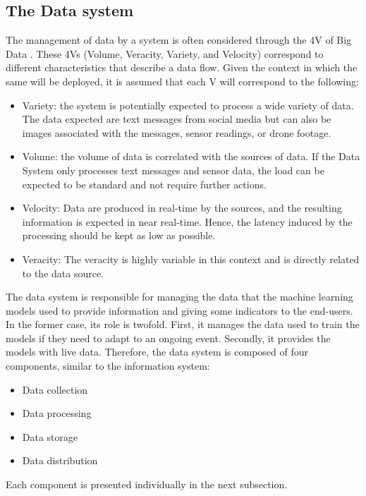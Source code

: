 \subsection{The Data system}
The management of data by a system is often considered through the 4V of Big Data \parencite{kalyvasBigDataPrimer2014}.
These 4Vs (Volume, Veracity, Variety, and Velocity) correspond to different characteristics that describe a data flow.
Given the context in which the same will be deployed, it is assumed that each V will correspond to the following:

\begin{itemize}
    \item Variety: the system is potentially expected to process a wide variety of data.
          The data expected are text messages from social media but can also be images associated with the messages, sensor readings, or drone footage.
    \item Volume: the volume of data is correlated with the sources of data.
          If the Data System only processes text messages and sensor data, the load can be expected to be standard and not require further actions.
    \item Velocity: Data are produced in real-time by the sources, and the resulting information is expected in near real-time.
          Hence, the latency induced by the processing should be kept as low as possible.
    \item Veracity: The veracity is highly variable in this context and is directly related to the data source.
\end{itemize}

The data system is responsible for managing the data that the machine learning models used to provide information and giving some indicators to the end-users.
In the former case, its role is twofold.
First, it manages the data used to train the models if they need to adapt to an ongoing event.
Secondly, it provides the models with live data.
Therefore, the data system is composed of four components, similar to the information system:

\begin{itemize}
    \item Data collection
    \item Data processing
    \item Data storage
    \item Data distribution
\end{itemize}

Each component is presented individually in the next subsection.

